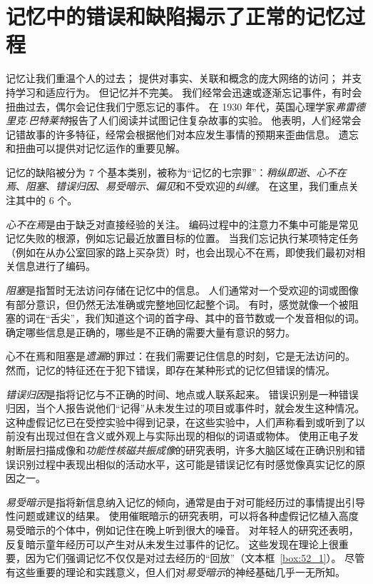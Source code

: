 \section{记忆中的错误和缺陷揭示了正常的记忆过程}

记忆让我们重温个人的过去； 提供对事实、关联和概念的庞大网络的访问；
并支持学习和适应行为。
但记忆并不完美。
我们经常会迅速或逐渐忘记事件，有时会扭曲过去，偶尔会记住我们宁愿忘记的事件。
在 1930 年代，英国心理学家\textit{弗雷德里克$\cdot$巴特莱特}报告了人们阅读并试图记住复杂故事的实验。
他表明，人们经常会记错故事的许多特征，经常会根据他们对本应发生事情的预期来歪曲信息。
遗忘和扭曲可以提供对记忆运作的重要见解。


记忆的缺陷被分为 7 个基本类别，被称为“记忆的七宗罪”：\textit{稍纵即逝}、\textit{心不在焉}、\textit{阻塞}、\textit{错误归因}、\textit{易受暗示}、\textit{偏见}和不受欢迎的\textit{纠缠}。
在这里，我们重点关注其中的 6 个。


\textit{心不在焉}是由于缺乏对直接经验的关注。
编码过程中的注意力不集中可能是常见记忆失败的根源，例如忘记最近放置目标的位置。
当我们忘记执行某项特定任务（例如在从办公室回家的路上买杂货）时，也会出现心不在焉，即使我们最初对相关信息进行了编码。


\textit{阻塞}是指暂时无法访问存储在记忆中的信息。
人们通常对一个受欢迎的词或图像有部分意识，但仍然无法准确或完整地回忆起整个词。
有时，感觉就像一个被阻塞的词在“舌尖”，我们知道这个词的首字母、其中的音节数或一个发音相似的词。
确定哪些信息是正确的，哪些是不正确的需要大量有意识的努力。


心不在焉和阻塞是\textit{遗漏}的罪过：在我们需要记住信息的时刻，它是无法访问的。
然而，记忆的特征还在于犯下错误，即存在某种形式的记忆但错误的情况。


\textit{错误归因}是指将记忆与不正确的时间、地点或人联系起来。
错误识别是一种错误归因，当个人报告说他们“记得”从未发生过的项目或事件时，就会发生这种情况。
这种虚假记忆已在受控实验中得到记录，在这些实验中，人们声称看到或听到了以前没有出现过但在含义或外观上与实际出现的相似的词语或物体。
使用正电子发射断层扫描成像和\textit{功能性核磁共振成像}的研究表明，许多大脑区域在正确识别和错误识别过程中表现出相似的活动水平，这可能是错误记忆有时感觉像真实记忆的原因之一。


\textit{易受暗示}是指将新信息纳入记忆的倾向，通常是由于对可能经历过的事情提出引导性问题或建议的结果。
使用催眠暗示的研究表明，可以将各种虚假记忆植入高度易受暗示的个体中，例如记住在晚上听到很大的噪音。
对年轻人的研究还表明，反复暗示童年经历可以产生对从未发生过事件的记忆。
这些发现在理论上很重要，因为它们强调记忆不仅仅是对过去经历的“回放”（文本框~\ref{box:52_1}）。
尽管有这些重要的理论和实践意义，但人们对\textit{易受暗示}的神经基础几乎一无所知。


